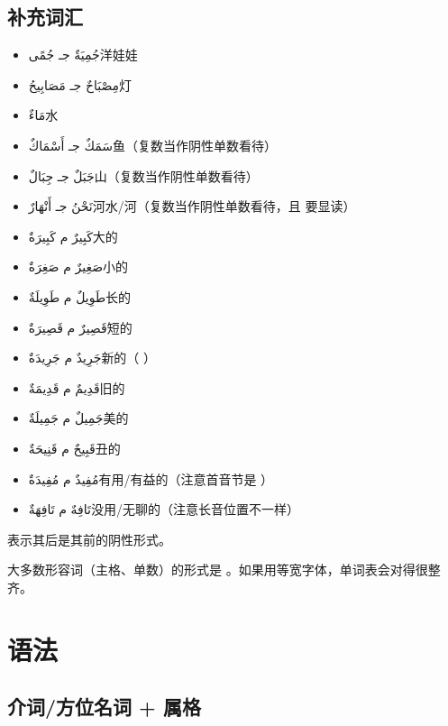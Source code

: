 \subsection{补充词汇}

\begin{itemize}
    \item \ac{جُمِيَةٌ جـ جُمًى}{洋娃娃}
    \item \ac{مِصْبَاحٌ جـ مَصَابِيحُ}{灯}
    \item \ac{مَاءٌ}{水}
    \item \ac{سَمَكٌ جـ أَسْمَاكٌ}{鱼（复数当作阴性单数看待）}
    \item \ac{جَبَلٌ جـ جِبَالٌ}{山（复数当作阴性单数看待）}
    \item \ac{نَحْنُ جـ أَنْهَارٌ}{河水/河（复数当作阴性单数看待，且  要显读）}
    \item \ac{كَبِيرٌ م كَبِيرَةٌ}{大的}
    \item \ac{صَغِيرٌ م صَغِرَةٌ}{小的}
    \item \ac{طَوِيلٌ م طَوِيلَةٌ}{长的}
    \item \ac{قَصِيرٌ م قَصِيرَةٌ}{短的}
    \item \ac{جَرِيدٌ م جَرِيدَةٌ}{新的（  ）}
    \item \ac{قَدِيمٌ م قَدِيمَةٌ}{旧的}
    \item \ac{جَمِيلٌ م جَمِيلَةٌ}{美的}
    \item \ac{قَبِيحٌ م قَنِيحَةٌ}{丑的}
    \item \ac{مُفِيدٌ م مُفِيدَةٌ}{有用/有益的（注意首音节是  ）}
    \item \ac{تَافِهٌ م تَافِهَةٌ}{没用/无聊的（注意长音位置不一样）}
\end{itemize}

\begin{attention}
     表示其后是其前的阴性形式。
\end{attention}

\begin{note}
    大多数形容词（主格、单数）的形式是 。如果用等宽字体，单词表会对得很整齐。
\end{note}

\section{语法}

\subsection{ 介词/方位名词 + 属格}

